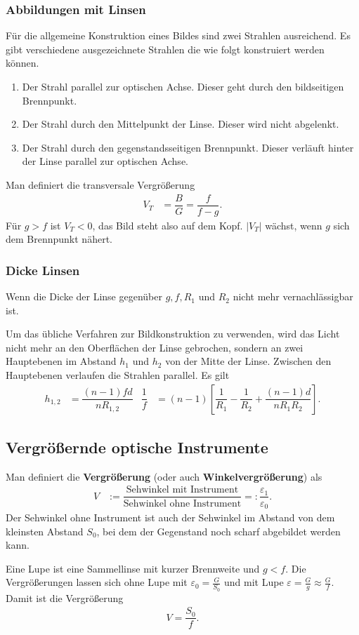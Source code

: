 \documentclass[a4paper,12pt]{article}
\numberwithin{equation}{section}
\begin{document}
\subsubsection{Abbildungen mit Linsen}
Für die allgemeine Konstruktion eines Bildes sind zwei Strahlen ausreichend. Es gibt verschiedene ausgezeichnete Strahlen die wie folgt konstruiert werden können.
\begin{enumerate}[label=\roman*)]
        \item Der Strahl parallel zur optischen Achse. Dieser geht durch den bildseitigen Brennpunkt.
        \item Der Strahl durch den Mittelpunkt der Linse. Dieser wird nicht abgelenkt.
        \item Der Strahl durch den gegenstandsseitigen Brennpunkt. Dieser verläuft hinter der Linse parallel zur optischen Achse.
\end{enumerate}
Man definiert die transversale Vergrößerung
\begin{align} 
        V_T&=\dfrac{B}{G}=\dfrac{f}{f-g}
.\end{align} 
Für $g>f$ ist $V_T<0$, das Bild steht also auf dem Kopf. $|V_T|$ wächst, wenn $g$ sich dem Brennpunkt nähert.

\subsubsection{Dicke Linsen}
Wenn die Dicke der Linse gegenüber $g,f,R_1$ und $R_2$ nicht mehr vernachlässigbar ist.\par
Um das übliche Verfahren zur Bildkonstruktion zu verwenden, wird das Licht nicht mehr an den Oberflächen der Linse gebrochen, sondern an zwei Hauptebenen im Abstand $h_1$ und $h_2$ von der Mitte der Linse.
Zwischen den Hauptebenen verlaufen die Strahlen parallel.
Es gilt
\begin{align} 
        h_{1,2}&=\dfrac{\left(n-1\right)fd}{nR_{1,2}}&\dfrac{1}{f}&=\left(n-1\right)\left[\dfrac{1}{R_1}-\dfrac{1}{R_2}+\dfrac{\left(n-1\right)d}{nR_1R_2}\right]
.\end{align} 

\subsection{Vergrößernde optische Instrumente}
Man definiert die \textbf{Vergrößerung} (oder auch \textbf{Winkelvergrößerung}) als
\begin{align} 
        V&:=\dfrac{\text{Sehwinkel mit Instrument}}{\text{Sehwinkel ohne Instrument}}=:\dfrac{\varepsilon _1}{\varepsilon _0}
.\end{align} 
Der Sehwinkel ohne Instrument ist auch der Sehwinkel im Abstand von dem kleinsten Abstand $S_0$, bei dem der Gegenstand noch scharf abgebildet werden kann.\par
Eine Lupe ist eine Sammellinse mit kurzer Brennweite und $g<f$. Die Vergrößerungen lassen sich ohne Lupe mit $\varepsilon _0=\tfrac{G}{S_0}$ und mit Lupe $\varepsilon =\tfrac{G}{g}\approx \tfrac{G}{f}$. Damit ist die Vergrößerung
\begin{align} 
        V=\dfrac{S_0}{f}
.\end{align} 
\end{document}
